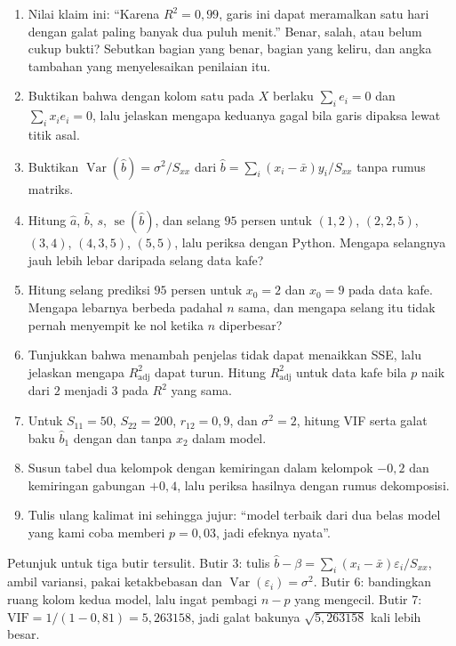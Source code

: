 \begin{latihan}
\begin{enumerate}
  \item Nilai klaim ini: ``Karena $R^2=0{,}99$, garis ini dapat meramalkan satu hari
        dengan galat paling banyak dua puluh menit.'' Benar, salah, atau belum cukup
        bukti? Sebutkan bagian yang benar, bagian yang keliru, dan angka tambahan yang
        menyelesaikan penilaian itu.
  \item Buktikan bahwa dengan kolom satu pada $X$ berlaku $\sum_i e_i=0$ dan
        $\sum_i x_ie_i=0$, lalu jelaskan mengapa keduanya gagal bila garis dipaksa lewat
        titik asal.
  \item Buktikan $\operatorname{Var}(\hat b)=\sigma^2/S_{xx}$ dari
        $\hat b=\sum_i(x_i-\bar x)y_i/S_{xx}$ tanpa rumus matriks.
  \item Hitung $\hat a$, $\hat b$, $s$, $\operatorname{se}(\hat b)$, dan selang $95$
        persen untuk $(1,2)$, $(2,2{,}5)$, $(3,4)$, $(4,3{,}5)$, $(5,5)$, lalu periksa
        dengan Python. Mengapa selangnya jauh lebih lebar daripada selang data kafe?
  \item Hitung selang prediksi $95$ persen untuk $x_0=2$ dan $x_0=9$ pada data kafe.
        Mengapa lebarnya berbeda padahal $n$ sama, dan mengapa selang itu tidak pernah
        menyempit ke nol ketika $n$ diperbesar?
  \item Tunjukkan bahwa menambah penjelas tidak dapat menaikkan SSE, lalu jelaskan
        mengapa $R^2_{\text{adj}}$ dapat turun. Hitung $R^2_{\text{adj}}$ untuk data kafe
        bila $p$ naik dari $2$ menjadi $3$ pada $R^2$ yang sama.
  \item Untuk $S_{11}=50$, $S_{22}=200$, $r_{12}=0{,}9$, dan $\sigma^2=2$, hitung VIF
        serta galat baku $\hat b_1$ dengan dan tanpa $x_2$ dalam model.
  \item Susun tabel dua kelompok dengan kemiringan dalam kelompok $-0{,}2$ dan kemiringan
        gabungan $+0{,}4$, lalu periksa hasilnya dengan rumus dekomposisi.
  \item Tulis ulang kalimat ini sehingga jujur: ``model terbaik dari dua belas model yang
        kami coba memberi $p=0{,}03$, jadi efeknya nyata''.
\end{enumerate}

Petunjuk untuk tiga butir tersulit. Butir 3: tulis $\hat b-\beta=\sum_i(x_i-\bar x)
\varepsilon_i/S_{xx}$, ambil variansi, pakai ketakbebasan dan
$\operatorname{Var}(\varepsilon_i)=\sigma^2$. Butir 6: bandingkan ruang kolom kedua model,
lalu ingat pembagi $n-p$ yang mengecil. Butir 7: $\mathrm{VIF}=1/(1-0{,}81)=5{,}263158$,
jadi galat bakunya $\sqrt{5{,}263158}$ kali lebih besar.
\end{latihan}

